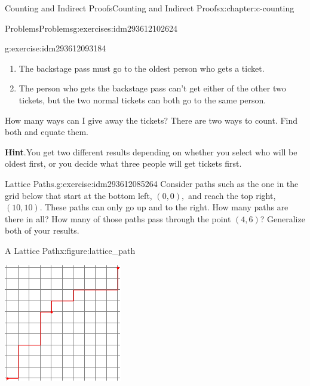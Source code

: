 \documentclass[twoside,10pt,]{book}
\newcommand{\blocktitlefont}{\relax}
\numberwithin{equation}{section}
\begin{document}
\begin{chapterptx}{Counting and Indirect Proofs}{}{Counting and Indirect Proofs}{}{}{x:chapter:c-counting}
\begin{exercises-section}{Problems}{}{Problems}{}{}{g:exercises:idm293612102624}
\begin{divisionexercise}{2}{}{}{g:exercise:idm293612093184}
\begin{enumerate}[label=(\alph*)]
\item{}The backstage pass must go to the oldest person who gets a ticket.%
\item{}The person who gets the backstage pass can't get either of the other two tickets, but the two normal tickets can both go to the same person.%
\end{enumerate}
How many ways can I give away the tickets? There are two ways to count. Find both and equate them.%
\par\smallskip%
\noindent\textbf{\blocktitlefont Hint}.\label{g:hint:idm293612086496}{}\hypertarget{g:hint:idm293612086496}{}\quad{}You get two different results depending on whether you select who will be oldest first, or you decide what three people will get tickets first.%
\end{divisionexercise}%
\begin{divisionexercise}{3}{Lattice Paths.}{}{g:exercise:idm293612085264}%
%
Consider paths such as the one in the grid below that start at the bottom left, \((0,0),\) and reach the top right, \((10,10)\).  These paths can only go up and to the right.  How many paths are there in all? How many of those paths pass through the point \((4,6)\)?  Generalize both of your results.%
\begin{figureptx}{A Lattice Path}{x:figure:lattice_path}{}%
\begin{image}{0.2}{0.6}{0.2}%
\includegraphics[width=\linewidth]{images/lattice_path.png}

\end{image}
\end{figureptx}
\end{divisionexercise}
\end{exercises-section}
\end{chapterptx}
\end{document}
